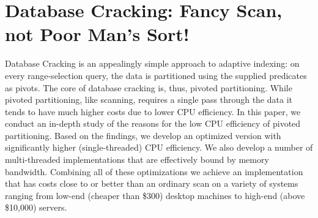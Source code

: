 \chapter{Database Cracking: Fancy Scan, not Poor Man's Sort!}

\label{damon}




	
  Database Cracking is an appealingly simple approach to adaptive
  indexing: on every range-selection query, the data is partitioned
  using the supplied predicates as pivots. The core of database
  cracking is, thus, pivoted partitioning. While pivoted partitioning,
  like scanning, requires a single pass through the data it tends to
  have much higher costs due to lower CPU efficiency. In this paper,
  we conduct an in-depth study of the reasons for the low CPU
  efficiency of pivoted partitioning. Based on the findings, we
  develop an optimized version with significantly higher
  (single-threaded) CPU efficiency. We also develop a number of
  multi-threaded implementations that are effectively bound by memory
  bandwidth. Combining all of these optimizations we achieve an
  implementation that has costs close to or better than an ordinary
  scan on a variety of systems ranging from low-end (cheaper than
  \$300) desktop machines to high-end (above \$10,000) servers.


